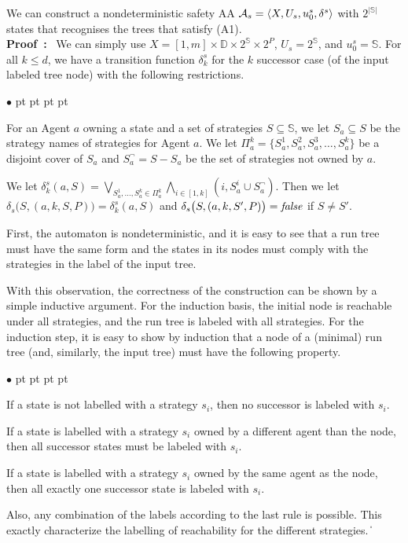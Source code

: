 \documentclass[11pt]{article}
\newcommand{\cala}{{\cal A}}
\newcommand{\false}{\mbox{\em false}}
\newcommand{\pf}{\noindent\mbox{\bf Proof : }}
\newcommand{\bbbbd}{{\mathbb D}}
\newcommand{\bbbbs}{{\mathbb S}}
\def\qed{\ifmmode\|\else{\unskip\nobreak\hfil
\penalty50\hskip1em\null\nobreak\hfil$\blacksquare$
\parfillskip=0pt\finalhyphendemerits=0\endgraf}\fi}
\newenvironment{list1}{\begin{list}{$\bullet$}
{\topsep 0 pt \parsep 0 pt \partopsep 0 pt \itemsep 0 pt}}{\end{list}}
\begin{document}
{\lemma \label{lemma.A1} 
We can construct a nondeterministic safety AA 
$\cala_s=\langle X,U_s,u_0^s,\delta^s \rangle$ 
with $2^{|\bbbbs|}$ states that recognises 
the trees that satisfy (A1).
}
\\\pf 
We can simply use 
$X = [1,m] \times \bbbbd \times 2^\bbbbs \times 2^P$,
$U_s = 2^\bbbbs$, and 
$u_0^s = \bbbbs$.   
For all $k \leq d$, we have a transition function 
$\delta_k^s$ for the $k$ successor case (of the input labeled tree node) 
with the following restrictions. 
\begin{list1}
\item For an Agent $a$ owning a state and a set of strategies 
  $S \subseteq \bbbbs$, we let
  $S_a \subseteq S$ be the strategy names of strategies 
  for Agent $a$.  
  We let $\Pi^k_a=\{S_a^1,S_a^2,S_a^3,\ldots, S_a^k\}$ be a disjoint cover of $S_a$
  and $S^\neg_a = S - S_a$ be the set of strategies not owned by $a$.  
\item We let $\delta_k^s(a,S) = \bigvee_{S_a^1,\ldots,S_a^k\in \Pi_a^k}
  \bigwedge_{i\in [1,k]}(i,S_a^i\cup S^\neg_a)$.  
  Then we let $\delta_s \big(S,(a,k,S,P)\big) = \delta_k^s(a,S)$ 
  and \linebreak 
  $\delta_s \big(S,(a,k,S',P)\big)=\false$ if $S\neq S'$.
\end{list1}
First, the automaton is nondeterministic, and it is easy to see that a run tree must have the same form and the states in its nodes must comply with the strategies in the label of the input tree.

With this observation, the correctness of the construction can be shown by a simple inductive argument.
For the induction basis, the initial node is reachable under all strategies, and the run tree is labeled with all strategies.
For the induction step, it is easy to show by induction that a node of a (minimal) run tree (and, similarly, the input tree) must have the following property.
\begin{list1}
 \item If a state is not labelled with a strategy $s_i$, then no successor is labeled with $s_i$.
 \item If a state is labelled with a strategy $s_i$ owned by a different agent than the node, then all successor states must be labeled with $s_i$.
 \item If a state is labelled with a strategy $s_i$ owned by the same agent as the node, then all exactly one successor state is labeled with $s_i$.
\end{list1}
Also, any combination of the labels according to the last rule is possible.
This exactly characterize the labelling of reachability for the different strategies.
\qed 
\end{document}
